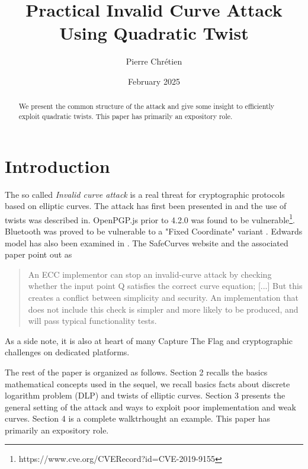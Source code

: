 \documentclass[10pt]{article}
\theoremstyle{definition}
\begin{document}

\author{Pierre Chrétien}
\title{Practical Invalid Curve Attack Using Quadratic Twist}
\date{February 2025}
\maketitle
\begin{abstract}
We present the common structure of the attack and give some insight to efficiently exploit quadratic twists. 
This paper has primarily an expository role.
\end{abstract}


\section{Introduction}

The so called \textsl{Invalid curve attack} is a real threat for cryptographic protocols based on elliptic curves.
The attack has first been presented in \cite{BMM00} and the use of twists was described in\cite{FLRV08}.
OpenPGP.js prior to 4.2.0 was found to be vulnerable\footnote{https://www.cve.org/CVERecord?id=CVE-2019-9155}. 
Bluetooth was proved to be vulnerable to a "Fixed Coordinate" variant  \cite{cryptoeprint:2019/1043}.
Edwards model has also been examined in \cite{NT15}.
The SafeCurves website and the associated paper \cite{cryptoeprint:2024/1265} point out as 
\begin{quote}
An ECC implementor can stop an invalid-curve attack by checking whether the input point Q satisfies the correct curve equation; [...]
But this creates a conflict between simplicity and security. An implementation that does not include this check is simpler and more likely to be produced, and will pass typical functionality tests. 
\end{quote}

\noindent As a side note, it is also at heart of many Capture The Flag and cryptographic challenges on dedicated platforms.

\vspace*{.5cm}
\noindent The rest of the paper is organized as follows.
Section 2 recalls the basics mathematical concepts used  in the sequel, we recall basics facts about discrete logarithm problem (DLP) and twists of elliptic curves.	
Section 3 presents the general setting of the attack and ways to exploit poor implementation and weak curves.
Section 4 is a complete walktrhought an example.
This paper has primarily an expository role.
\end{document}
